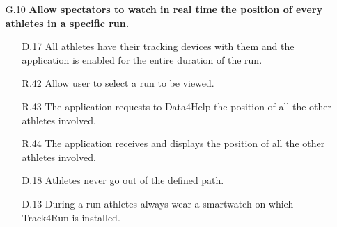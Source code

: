 \begin{enumerate}
\begin{enumerate}
	\item [G.10] \textbf{Allow spectators to watch in real time the position of every athletes in a specific run.}
		\begin{enumerate}
		\item [D.17] All athletes have their tracking devices with them and the application is enabled for the entire duration of the run.	
		\item [R.42] Allow user to select a run to be viewed.
		\item [R.43] The application requests to Data4Help the position of all the other athletes involved.
		\item [R.44] The application receives and displays the position of all the other athletes involved.
		\item [D.18] Athletes never go out of the defined path.
		\item [D.13] During a run athletes always wear a smartwatch on which Track4Run is installed.
		\end{enumerate}
	\end{enumerate}

\end{enumerate}
\clearpage

